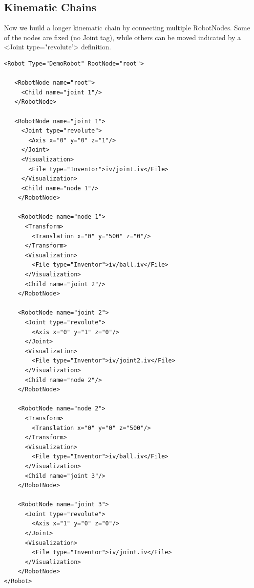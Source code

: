\subsection{Kinematic Chains}
\par
Now we build a longer kinematic chain by connecting multiple RobotNodes. Some of the nodes are fixed (no Joint tag), while others can be moved indicated by a <Joint type="revolute'> definition. 
\par
\begin{lstlisting}
<Robot Type="DemoRobot" RootNode="root">

   <RobotNode name="root">
     <Child name="joint 1"/>
   </RobotNode>

   <RobotNode name="joint 1">
     <Joint type="revolute">
       <Axis x="0" y="0" z="1"/>
     </Joint>
     <Visualization>
       <File type="Inventor">iv/joint.iv</File>
     </Visualization>
     <Child name="node 1"/>
    </RobotNode>

    <RobotNode name="node 1">
      <Transform>
        <Translation x="0" y="500" z="0"/>
      </Transform>
      <Visualization>
        <File type="Inventor">iv/ball.iv</File>
      </Visualization>
      <Child name="joint 2"/>
    </RobotNode>

    <RobotNode name="joint 2">
      <Joint type="revolute">
        <Axis x="0" y="1" z="0"/>
      </Joint>
      <Visualization>
        <File type="Inventor">iv/joint2.iv</File>
      </Visualization>
      <Child name="node 2"/>
    </RobotNode>

    <RobotNode name="node 2">
      <Transform>
        <Translation x="0" y="0" z="500"/>
      </Transform>
      <Visualization>
        <File type="Inventor">iv/ball.iv</File>
      </Visualization>
      <Child name="joint 3"/>
    </RobotNode>

    <RobotNode name="joint 3">
      <Joint type="revolute">
        <Axis x="1" y="0" z="0"/>
      </Joint>
      <Visualization>
        <File type="Inventor">iv/joint.iv</File>
      </Visualization>
    </RobotNode> 
</Robot>
\end{lstlisting}
\par
